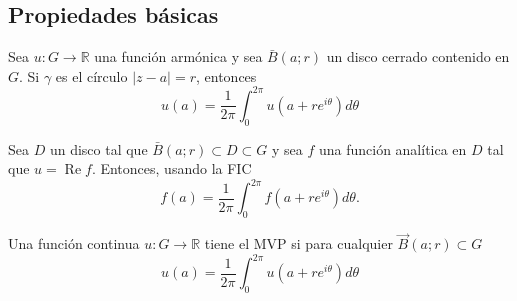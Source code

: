 \subsection{Propiedades básicas}



\begin{teorema}
    Sea $u: G \rightarrow \mathbb{R}$ una función armónica y sea $\bar{B}(a ; r)$ un disco cerrado contenido en $G$. Si $\gamma$ es el círculo $|z-a|=r$, entonces$$
u(a)=\frac{1}{2 \pi} \int_0^{2 \pi} u\left(a+r e^{i \theta}\right) d \theta
$$
\begin{dem}
    Sea $D$ un disco tal que $\bar{B}(a ; r) \subset D \subset G$  y sea $f$ una función analítica en $D$ tal que $u=\operatorname{Re} f$. Entonces, usando la FIC 
    $$
f(a)=\frac{1}{2 \pi} \int_0^{2 \pi} f\left(a+r e^{i \theta}\right) d \theta .
$$
\end{dem}
\end{teorema}

\begin{definicion}
    Una función continua $u: G \rightarrow \mathbb{R}$ tiene el MVP si para cualquier $\vec{B}(a ; r) \subset G$
$$
u(a)=\frac{1}{2 \pi} \int_0^{2 \pi} u\left(a+r e^{i \theta}\right) d \theta
$$
\end{definicion}


